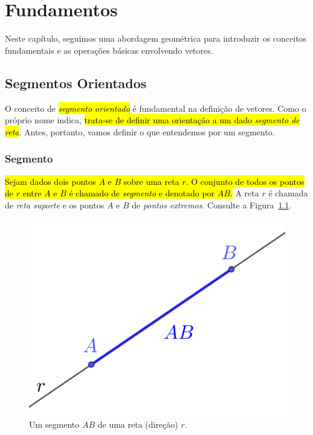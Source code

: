 
\chapter{Fundamentos}\label{cap_vetor}

Neste capítulo, seguimos uma abordagem geométrica para introduzir os conceitos fundamentais e as operações básicas envolvendo vetores.

\section{Segmentos Orientados}\label{cap_vetor_sec_segorien}

O conceito de \hl{\emph{segmento orientado}} é fundamental na definição de vetores. Como o próprio nome indica, \hl{trata-se de definir uma orientação a um dado \emph{segmento de reta}}. Antes, portanto, vamos definir o que entendemos por um segmento.

\subsection{Segmento}

\hl{Sejam dados dois pontos $A$ e $B$ sobre uma reta $r$. O conjunto de todos os pontos de $r$ entre $A$ e $B$ é chamado de \emph{segmento} e denotado por $AB$.} A reta $r$ é chamada de \emph{reta suporte} e os pontos $A$ e $B$ de \emph{pontos extremos}. Consulte a Figura~\ref{cap_vetor_sec_segorien:fig:segmento}.

\begin{figure}[h]
  \centering
  \includegraphics{./cap_vetor/dados/fig_segmento/fig.png}
  \caption{Um segmento $AB$ de uma reta (direção) $r$.}
  \label{cap_vetor_sec_segorien:fig:segmento}
\end{figure}

